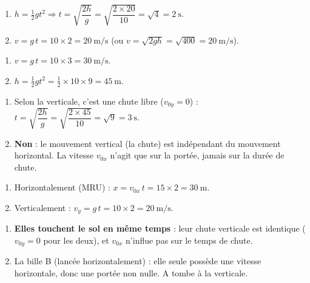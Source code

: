 \documentclass[11pt,a4paper]{article}
\begin{document}

\begin{corrige}
\begin{enumerate}[label=\alph*)]
  \item $h=\tfrac12 g t^2 \Rightarrow t=\sqrt{\dfrac{2h}{g}}=\sqrt{\dfrac{2\times20}{10}}=\sqrt{4}=\qty{2}{\second}$.
  \item $v=g\,t=10\times2=\qty{20}{\metre\per\second}$ (ou $v=\sqrt{2gh}=\sqrt{400}=\qty{20}{\metre\per\second}$).
\end{enumerate}
\end{corrige}

\begin{corrige}
\begin{enumerate}[label=\alph*)]
  \item $v=g\,t=10\times3=\qty{30}{\metre\per\second}$.
  \item $h=\tfrac12 g t^2=\tfrac12\times10\times9=\qty{45}{\metre}$.
\end{enumerate}
\end{corrige}

\begin{corrige}
\begin{enumerate}[label=\alph*)]
  \item Selon la verticale, c'est une chute libre ($v_{0y}=0$) : $t=\sqrt{\dfrac{2h}{g}}=\sqrt{\dfrac{2\times45}{10}}=\sqrt{9}=\qty{3}{\second}$.
  \item \textbf{Non} : le mouvement vertical (la chute) est indépendant du mouvement horizontal. La vitesse $v_{0x}$ n'agit que sur la portée, jamais sur la durée de chute.
\end{enumerate}
\end{corrige}

\begin{corrige}
\begin{enumerate}[label=\alph*)]
  \item Horizontalement (MRU) : $x=v_{0x}\,t=15\times2=\qty{30}{\metre}$.
  \item Verticalement : $v_y=g\,t=10\times2=\qty{20}{\metre\per\second}$.
\end{enumerate}
\end{corrige}

\begin{corrige}
\begin{enumerate}[label=\alph*)]
  \item \textbf{Elles touchent le sol en même temps} : leur chute verticale est identique ($v_{0y}=0$ pour les deux), et $v_{0x}$ n'influe pas sur le temps de chute.
  \item La bille B (lancée horizontalement) : elle seule possède une vitesse horizontale, donc une portée non nulle. A tombe à la verticale.
\end{enumerate}
\end{corrige}
\end{document}
